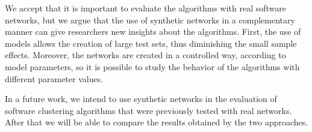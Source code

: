We accept that it is important to evaluate the algorithms with real software
networks, but we argue that the use of synthetic networks in a complementary
manner can give researchers new insights about the algorithms. First, the use
of models allows the creation of large test sets, thus diminishing the small
sample effects. Moreover, the networks are created in a controlled way,
according to model parameters, so it is possible to study the behavior of the
algorithms with different parameter values.

In a future work, we intend to use synthetic networks in the evaluation of
software clustering algorithms that were previously tested with real networks.
After that we will be able to compare the results obtained by the two
approaches.



